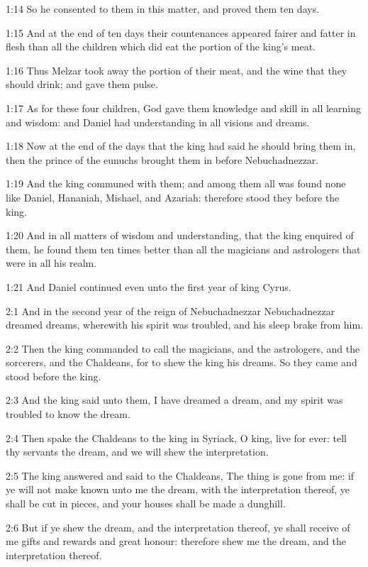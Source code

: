 1:14 So he consented to them in this matter, and proved them ten days.

1:15 And at the end of ten days their countenances appeared fairer and
fatter in flesh than all the children which did eat the portion of the
king's meat.

1:16 Thus Melzar took away the portion of their meat, and the wine
that they should drink; and gave them pulse.

1:17 As for these four children, God gave them knowledge and skill in
all learning and wisdom: and Daniel had understanding in all visions
and dreams.

1:18 Now at the end of the days that the king had said he should bring
them in, then the prince of the eunuchs brought them in before
Nebuchadnezzar.

1:19 And the king communed with them; and among them all was found
none like Daniel, Hananiah, Mishael, and Azariah: therefore stood they
before the king.

1:20 And in all matters of wisdom and understanding, that the king
enquired of them, he found them ten times better than all the
magicians and astrologers that were in all his realm.

1:21 And Daniel continued even unto the first year of king Cyrus.

2:1 And in the second year of the reign of Nebuchadnezzar
Nebuchadnezzar dreamed dreams, wherewith his spirit was troubled, and
his sleep brake from him.

2:2 Then the king commanded to call the magicians, and the
astrologers, and the sorcerers, and the Chaldeans, for to shew the
king his dreams. So they came and stood before the king.

2:3 And the king said unto them, I have dreamed a dream, and my spirit
was troubled to know the dream.

2:4 Then spake the Chaldeans to the king in Syriack, O king, live for
ever: tell thy servants the dream, and we will shew the
interpretation.

2:5 The king answered and said to the Chaldeans, The thing is gone
from me: if ye will not make known unto me the dream, with the
interpretation thereof, ye shall be cut in pieces, and your houses
shall be made a dunghill.

2:6 But if ye shew the dream, and the interpretation thereof, ye shall
receive of me gifts and rewards and great honour: therefore shew me
the dream, and the interpretation thereof.

